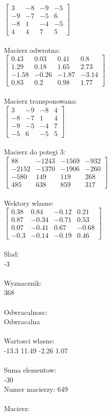 \documentclass[a4paper,12pt]{article}
\begin{document}
$\begin{bmatrix} 3&-8&-9&-5\\-9&-7&-5&6\\-8&1&-4&-5\\4&4&7&5 \end{bmatrix}$
\\
\\
Macierz odwrotna:\\

$\begin{bmatrix} 0.43&0.03&0.41&0.8\\1.29&0.18&1.65&2.73\\-1.58&-0.26&-1.87&-3.14\\0.83&0.2&0.98&1.77 \end{bmatrix}$
\\
\\
Macierz transponowana:\\

$\begin{bmatrix} 3&-9&-8&4\\-8&-7&1&4\\-9&-5&-4&7\\-5&6&-5&5 \end{bmatrix}$
\\
\\
Macierz do potegi 3:\\

$\begin{bmatrix} 88&-1243&-1569&-932\\-2152&-1370&-1906&-260\\-580&149&119&268\\485&638&859&317 \end{bmatrix}$
\\
\\
Wektory wlasne:\\

$\begin{bmatrix} 0.38&0.84&-0.12&0.21\\0.87&-0.34&-0.71&0.53\\0.07&-0.41&0.67&-0.68\\-0.3&-0.14&-0.19&0.46 \end{bmatrix}$
\\
\\
Slad:\\
-3
\\
\\
Wyznacznik:\\
368
\\
\\
Odwracalnosc:\\
Odwracalna
\\
\\
Wartosci wlasne:\\
-13.3 11.49 -2.26 1.07
\\
\\
Suma elementow:\\
-30
\\
\newpage
Numer macierzy:
649
\\
\\
Macierz:\\
\end{document}
